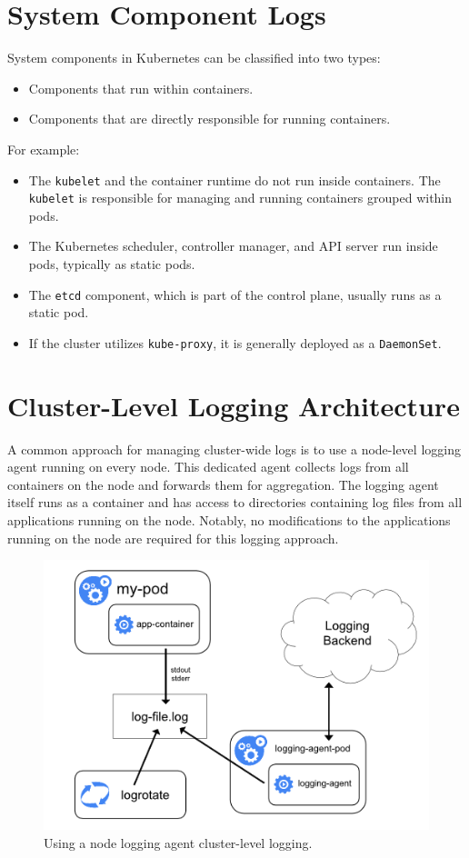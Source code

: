 \documentclass[../main.tex]{subfiles}
\begin{document}
\section{System Component Logs}
System components in Kubernetes can be classified into two types:  
\begin{itemize}
    \item Components that run within containers.
    \item Components that are directly responsible for running containers.
\end{itemize}

For example:
\begin{itemize}
    \item The \texttt{kubelet} and the container runtime do not run inside containers. The \texttt{kubelet} is responsible for managing and running containers grouped within pods.
    \item The Kubernetes scheduler, controller manager, and API server run inside pods, typically as static pods.
    \item The \texttt{etcd} component, which is part of the control plane, usually runs as a static pod.
    \item If the cluster utilizes \texttt{kube-proxy}, it is generally deployed as a \texttt{DaemonSet}.
\end{itemize}

\section{Cluster-Level Logging Architecture}
A common approach for managing cluster-wide logs is to use a node-level logging agent running on every node. This dedicated agent collects logs from all containers on the node and forwards them for aggregation. The logging agent itself runs as a container and has access to directories containing log files from all applications running on the node. Notably, no modifications to the applications running on the node are required for this logging approach. \cite{loggingkubernetes}

\begin{figure}[H]
    \centering
    \includegraphics[scale=0.55]{img/3-background/kubernetes/node_agent.png}
    \caption{Using a node logging agent cluster-level logging. \protect\footnotemark}
    \label{fig:node_agent}
\end{figure}
\end{document}
